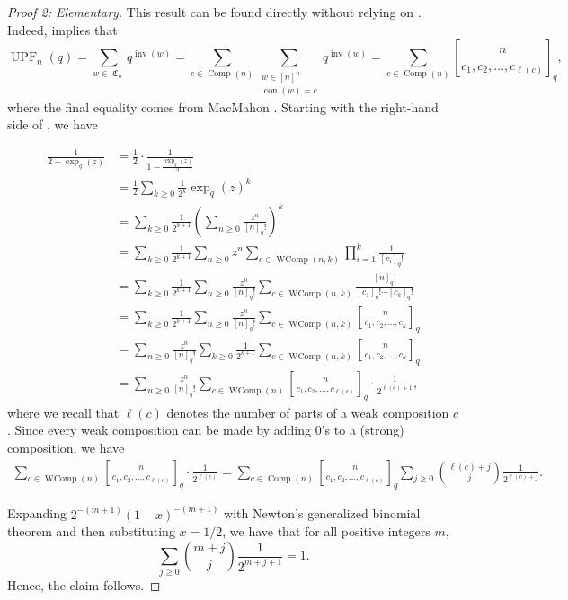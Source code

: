 \documentclass{amsart}
\DeclareMathOperator{\inv}{inv}
\DeclareMathOperator{\UPF}{UPF} %
\DeclareMathOperator{\Comp}{Comp}
\DeclareMathOperator{\WComp}{WComp}
\DeclareMathOperator{\con}{con}
\DeclareMathOperator{\C}{\mathfrak{C}}
\newcommand{\qbinom}[2]{\genfrac{[}{]}{0pt}{}{#1}{#2}}%
\newcommand{\lp}{\left(}
\newcommand{\rp}{\right)}
\theoremstyle{definition}
\begin{document}
\begin{proof}[Proof 2: Elementary]
This result can be found directly without relying on . Indeed,  implies that 
\begin{equation}\UPF_n(q)=\sum_{w\in \C_n}q^{\inv(w)}=\sum_{c\in \Comp(n)} \sum_{\substack{w\in [n]^n\\\con(w)=c}}q^{\inv(w)}=\sum_{c\in \Comp(n)} \qbinom{n}{c_1,c_2,\dots,c_{\ell(c)}}_q,\end{equation}
where the final equality comes from MacMahon \cite{MacMahon}.
Starting with the right-hand side of , we have 

\begin{align*}
    \frac{1}{2-\exp_{q}(z)}&=
    \frac{1}{2}\cdot \frac{1}{1-\frac{\exp_{q}(z)}{2}}\\
    &=\frac{1}{2}\sum_{k\geq 0}\frac{1}{2^k}\exp_q(z)^{k}\\
    &=\sum_{k\geq 0}\frac{1}{2^{k+1}}\lp \sum_{n\geq 0}\frac{z^n}{[n]_q!}\rp ^{k}\\
    &=\sum_{k\geq 0}\frac{1}{2^{k+1}}\sum_{n\geq 0}z^n \sum_{c\in \WComp(n,k)}\prod_{i=1}^{k}\frac{1}{[c_i]_q!}\\
    &=\sum_{k\geq 0}\frac{1}{2^{k+1}}\sum_{n\geq 0}\frac{z^n}{[n]_q!} \sum_{c\in \WComp(n,k)}\frac{[n]_q!}{[c_1]_q!\cdots [c_k]_q!}\\
    &=\sum_{k\geq 0}\frac{1}{2^{k+1}}\sum_{n\geq 0}\frac{z^n}{[n]_q!} \sum_{c\in \WComp(n,k)} \qbinom{n}{c_1,c_2,\dots,c_{k}}_q\\
    &=\sum_{n\geq 0}\frac{z^n}{[n]_q!} \sum_{k\geq 0}\frac{1}{2^{k+1}}\sum_{c\in \WComp(n,k)} \qbinom{n}{c_1,c_2,\dots,c_{k}}_q\\
     &=\sum_{n\geq 0}\frac{z^n}{[n]_q!} \sum_{c\in \WComp(n)} \qbinom{n}{c_1,c_2,\dots,c_{\ell(c)}}_q\cdot \frac{1}{2^{\ell(c)+1}},
\end{align*}
where we recall that $\ell(c)$ denotes the number of parts of a weak composition $c$.
Since every weak composition can be made by adding 0's to a (strong) composition, we have
\begin{align*}
    \sum_{c\in \WComp(n)} \qbinom{n}{c_1,c_2,\dots,c_{\ell(c)}}_q\cdot \frac{1}{2^{\ell(c)}}=\sum_{c\in \Comp(n)} \qbinom{n}{c_1,c_2,\dots,c_{\ell(c)}}_q \sum_{j\geq 0}\binom{\ell(c)+j}{j}\frac{1}{2^{\ell(c)+j}}.
\end{align*}

Expanding $ 2^{-(m+1)}(1-x)^{-(m+1)}$ with Newton's generalized binomial theorem and then substituting $x=1/2$, we have that for all positive integers $m$,
  \[\sum_{j\geq 0}\binom{m+j}{j}\frac{1}{2^{m+j+1}}=1.\]  
 Hence, the claim follows.
\end{proof}
\end{document}

